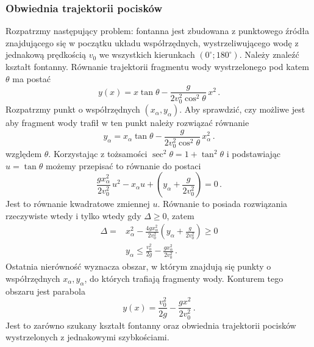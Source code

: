 \documentclass[../main.tex]{subfiles}
\begin{document}
\subsubsection*{Obwiednia trajektorii pocisków}
Rozpatrzmy następujący problem: fontanna jest zbudowana z punktowego źródła znajdującego się w początku układu współrzędnych, wystrzeliwującego wodę z jednakową prędkością \(v_0\) we wszystkich kierunkach \((0^\circ;180^\circ)\). Należy znaleźć kształt fontanny. Równanie trajektorii fragmentu wody wystrzelonego pod katem \(\theta\) ma postać
\begin{equation*}
    y(x)=x\tan\theta-\frac{g}{2v_0^2\cos^2\theta}\,x^2\,.
\end{equation*}
Rozpatrzmy punkt o współrzędnych \((x_\alpha,y_\alpha)\). Aby sprawdzić, czy możliwe jest aby fragment wody trafił w ten punkt należy rozwiązać równanie
\begin{equation*}
    y_\alpha=x_\alpha\tan\theta-\frac{g}{2v_0^2\cos^2\theta}\,x_\alpha^2\,.
\end{equation*}
względem \(\theta\). Korzystając z tożsamości \(\sec^2\theta=1+\tan^2\theta\) i podstawiając \(u=\tan \theta\) możemy przepisać to równanie do postaci
\begin{equation*}
    \frac{gx_\alpha^2}{2v_0^2}\,u^2-x_\alpha u+\left(y_\alpha+\frac{g}{2v_0^2}\right)=0\,.
\end{equation*}
Jest to równanie kwadratowe zmiennej \(u\). Równanie to posiada rozwiązania rzeczywiste wtedy i tylko wtedy gdy \(\Delta \geq0\), zatem
\begin{equation*}
    \begin{split}
        \Delta = &x_\alpha^2-\frac{4gx_\alpha^2}{2v_0^2}\left(y_\alpha+\frac{g}{2v_0^2}\right)\geq0\\
        &y_\alpha\leq \frac{v_0^2}{2g}-\frac{gx_\alpha^2}{2v_0^2}\,.
    \end{split}
\end{equation*}
Ostatnia nierówność wyznacza obszar, w którym znajdują się punkty o współrzędnych \(x_\alpha,y_\alpha\), do których trafiają fragmenty wody. Konturem tego obszaru jest parabola
\begin{equation*}
   y(x)=\frac{v_0^2}{2g}-\frac{gx^2}{2v_0^2}\,.
\end{equation*}
Jest to zarówno szukany kształt fontanny oraz obwiednia trajektorii pocisków wystrzelonych z jednakowymi szybkościami.
\medskip
\end{document}
